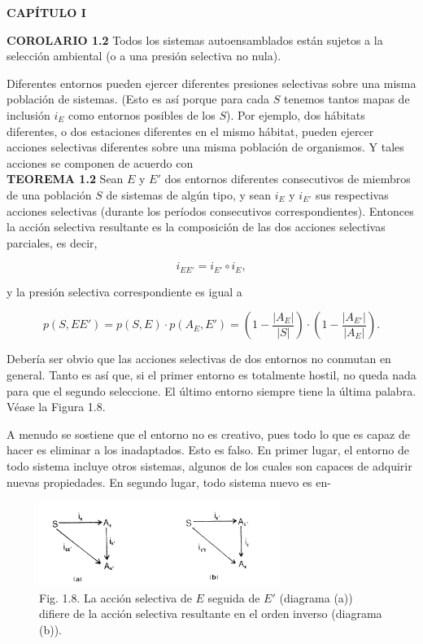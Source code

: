 \newpage
\fancyhf{}
\fancyhead[l]{\thepage}
\begin{center}
{\fontsize{13}{16}\selectfont \textbf{CAPÍTULO I}}
\end{center}
\vspace{0.5cm}

{\fontsize{13}{15}\selectfont
\textbf{COROLARIO 1.2} Todos los sistemas autoensamblados están sujetos a la selección ambiental (o a una presión selectiva no nula).

Diferentes entornos pueden ejercer diferentes presiones selectivas sobre una misma población de sistemas. (Esto es así porque para cada \( S \) tenemos tantos mapas de inclusión \( i_E \) como entornos posibles de los \( S \)). Por ejemplo, dos hábitats diferentes, o dos estaciones diferentes en el mismo hábitat, 
pueden ejercer acciones selectivas diferentes sobre una misma población de organismos. Y tales acciones se componen de acuerdo con \\

\textbf{TEOREMA 1.2} Sean \( E \) y \( E' \) dos entornos diferentes consecutivos de miembros de una población \( S \) de sistemas de algún tipo, y sean \( i_E \) y \( i_{E'} \) sus respectivas acciones selectivas (durante los períodos consecutivos correspondientes). Entonces la acción selectiva resultante es la composición de las dos acciones selectivas parciales, es decir,

\[i_{EE'} = i_{E'} \circ i_E,\]

y la presión selectiva correspondiente es igual a

\[p(S, EE') = p(S, E) \cdot p(A_E, E') = \left( 1 - \frac{|A_E|}{|S|} \right) \cdot \left( 1 - \frac{|A_{E'}|}{|A_E|} \right).\]

Debería ser obvio que las acciones selectivas de dos entornos no conmutan en general. Tanto es así que, si el primer entorno es totalmente hostil, no queda nada para que el segundo seleccione. El último entorno siempre tiene la última palabra. Véase la Figura 1.8.

A menudo se sostiene que el entorno no es creativo, pues todo lo que es capaz de hacer es eliminar a los inadaptados. Esto es falso. En primer lugar, el entorno de todo sistema incluye otros sistemas, algunos de los cuales son capaces de adquirir nuevas propiedades. En segundo lugar, todo sistema nuevo es en-
}

\begin{figure}[h!]
    \centering
    \includegraphics[width=0.7\textwidth]{imagenes/figura1.8.png}
    \caption*{Fig. 1.8. La acción selectiva de \( E \) seguida de \( E' \) (diagrama (a)) difiere de la acción selectiva resultante en el orden inverso (diagrama (b)).}
\end{figure}

